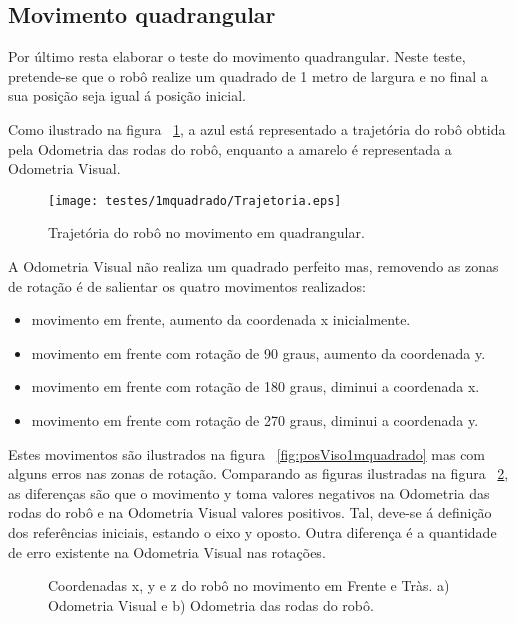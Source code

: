 \FloatBarrier
\subsection{Movimento quadrangular}\label{subsubsection:Quadrado}


Por último resta elaborar o teste do movimento quadrangular. Neste teste, pretende-se que o robô realize um quadrado de 1 metro de largura e no final a sua posição seja igual á posição inicial.

Como ilustrado na figura ~\ref{fig:trajRobo1mquadrado}, a azul está representado a trajetória do robô obtida pela Odometria das rodas do robô, enquanto a amarelo é representada a Odometria Visual. 


\begin{figure}[h!]
	\begin{center}
		\leavevmode		
		\texttt{[image: testes/1mquadrado/Trajetoria.eps]}
		\caption{Trajetória do robô no movimento em quadrangular.}
		\label{fig:trajRobo1mquadrado}
	\end{center}
\end{figure}


A Odometria Visual não realiza um quadrado perfeito mas, removendo as zonas de rotação é de salientar os quatro movimentos realizados:
\begin{itemize}
 	\item movimento em frente, aumento da coordenada x inicialmente.
 	\item movimento em frente com rotação de 90 graus, aumento da coordenada y.
 	\item movimento em frente com rotação de 180 graus, diminui a coordenada x.
 	\item movimento em frente com rotação de 270 graus, diminui a coordenada y.
\end{itemize}

Estes movimentos são ilustrados na figura ~\ref{fig:posViso1mquadrado} mas com alguns erros nas zonas de rotação. Comparando as figuras ilustradas na figura ~\ref{fig:pos1mquadrado}, as diferenças são que o movimento y toma valores negativos na Odometria das rodas do robô e na Odometria Visual valores positivos. Tal, deve-se á definição dos referências iniciais, estando o eixo y oposto. Outra diferença é a quantidade de erro existente na Odometria Visual nas rotações.


\begin{figure}[h!]
	\centering
	\qquad
	\caption{Coordenadas x, y e z do robô  no movimento em Frente e Tràs. a) Odometria Visual e b) Odometria das rodas do robô.}
	\label{fig:pos1mquadrado}
\end{figure}


